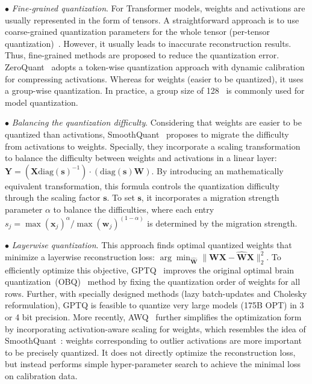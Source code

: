 $\bullet$ \emph{Fine-grained quantization}.
For Transformer models, weights and activations are usually represented in the form of tensors. A straightforward approach is to use coarse-grained   quantization parameters for the  whole tensor (\ie  per-tensor quantization)~\cite{Xiao-CoRR-2022-SmoothQuant}. However, it usually leads to inaccurate reconstruction results. 
Thus, fine-grained  methods are proposed to reduce the quantization error.  %
ZeroQuant~\cite{Yao-NeurlPS-2022-ZeroQuant} adopts a  token-wise quantization approach with dynamic calibration for compressing activations. Whereas for weights (easier to be quantized), it uses a group-wise quantization. In practice, a group size of 128~\cite{Yao-NeurlPS-2022-ZeroQuant,Lin-arXiv-2023-AWQ} is commonly used for model quantization.  %









$\bullet$ \emph{Balancing the quantization difficulty}.   
Considering that weights are easier to be quantized than activations, SmoothQuant~\cite{Xiao-CoRR-2022-SmoothQuant}  proposes to migrate the difficulty from  activations to weights. Specially, they incorporate a scaling transformation  to balance the difficulty between weights and activations in a linear layer: $\mathbf{Y} = (\mathbf{X}\text{diag}(\mathbf{s})^{-1}) \cdot (\text{diag}(\mathbf{s})\mathbf{W})$. %
By introducing an mathematically equivalent transformation, this formula  controls the quantization difficulty through the scaling factor $\mathbf{s}$. 
To set $\mathbf{s}$, it  incorporates a migration strength parameter $\alpha$ to balance the difficulties,  where each entry $s_j=\max(\mathbf{x}_j)^\alpha / \max(\mathbf{w}_j)^{(1-\alpha)}$ is determined by  the migration strength.  %



{
$\bullet$ \emph{Layerwise quantization}. This approach finds optimal  quantized weights that minimize a layerwise reconstruction loss: {$\arg\min_{\widehat{\mathbf{W}}}\parallel \mathbf{W}\mathbf{X} -  \widehat{\mathbf{W}} \mathbf{X}\parallel_2^2$}.  %
To efficiently optimize this objective, GPTQ~\cite{frantar-arxiv-2022-gptq} improves the  original optimal brain quantization~(OBQ)~\cite{Frantar-NeurIPS-2022-Optimal} method by fixing the quantization order of weights for all rows. 
Further, with specially designed   methods (\ie lazy batch-updates and Cholesky reformulation),  GPTQ  is feasible to quantize very large models (\eg 175B OPT)  in 3 or 4 bit precision.   
More recently, AWQ~\cite{Lin-arXiv-2023-AWQ} further simplifies the optimization form by incorporating activation-aware scaling for weights, which resembles the idea of  SmoothQuant~\cite{Xiao-CoRR-2022-SmoothQuant}: weights corresponding to outlier activations are more important to be precisely quantized. It does not directly optimize the reconstruction loss, but instead performs simple hyper-parameter search to achieve  the minimal  loss on calibration data. 
}

